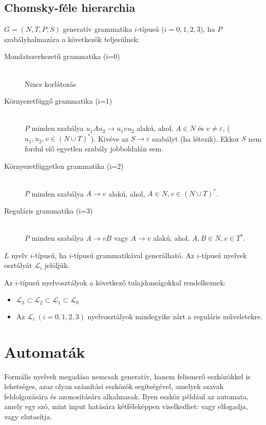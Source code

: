 \documentclass[margin=0px]{article}
\begin{document}
				\subsection{Chomsky-féle hierarchia}
					 $G = (N,T,P,S)$ generatív grammatika $i$-típusú ($i=0,1,2,3$), ha $P$ szabályhalmazára a következők teljesülnek:
						\begin{description}
							\item[Mondatszerkezetű grammatika (i=0)] \hfill \\ 
								Nincs korlátozás
							\item[Környezetfüggő grammatika (i=1)] \hfill \\
								$P$ minden szabálya $u_1Au_2 \rightarrow u_1vu_2$ alakú, ahol, $A\in N$ és $ v \neq \varepsilon $, ($u_1,u_2, v \in (N \cup T)^*$).
								Kivéve az $S \rightarrow \varepsilon$ szabályt (ha létezik). Ekkor $S$ nem fordul elő egyetlen szabály jobboldalán sem.
							\item[Környezetfüggetlen grammatika (i=2)] \hfill \\
								$P$ minden szabálya $A \rightarrow v$ alakú, ahol, $A\in N, v \in (N \cup T)^*$.
							\item[Reguláris grammatika (i=3)] \hfill \\
								$P$ minden szabálya $A \rightarrow vB$ vagy $A \rightarrow v$ alakú, ahol, $A,B\in N, v \in T^*$.
						\end{description}
					
					\noindent
					$L$ nyelv $i$-típusú, ha $i$-típusú grammatikával generálható. Az $i$-típusú nyelvek osztályát $\mathcal{L}_i$ jelöljük. 
					
					\noindent
					Az $i$-típusú nyelvosztályok a következő tulajdonságokkal rendelkeznek:
					\begin{itemize}
						\item $ \mathcal{L}_3 \subset \mathcal{L}_2 \subset \mathcal{L}_1 \subset \mathcal{L}_0 $
						\item Az $\mathcal{L}_i \ (i=0,1,2,3)$ nyelvosztályok mindegyike zárt a reguláris műveletekre. 
					\end{itemize}
 	\section{Automaták}
	 	Formális nyelvek megadása nemcsak generatív, hanem felismerő eszközökkel is lehetséges, azaz olyan számítási eszközök segítségével, amelyek szavak feldolgozására és azonosítására alkalmasak.
	 	Ilyen eszköz például az automata, amely egy szó, mint input hatására kétféleképpen viselkedhet: vagy elfogadja, vagy elutasítja.
\end{document}
